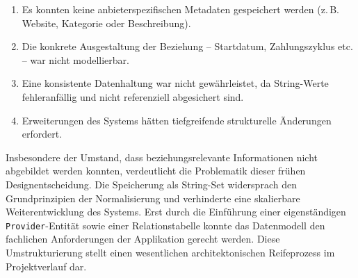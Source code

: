 \begin{enumerate}
    \item Es konnten keine anbieterspezifischen Metadaten gespeichert werden
    (z.\,B. Website, Kategorie oder Beschreibung).
    \item Die konkrete Ausgestaltung der Beziehung -- Startdatum, Zahlungszyklus
    etc. -- war nicht modellierbar.
    \item Eine konsistente Datenhaltung war nicht gewährleistet, da String-Werte
    fehleranfällig und nicht referenziell abgesichert sind.
    \item Erweiterungen des Systems hätten tiefgreifende strukturelle Änderungen
    erfordert.
\end{enumerate}

Insbesondere der Umstand, dass beziehungsrelevante Informationen nicht abgebildet
werden konnten, verdeutlicht die Problematik dieser frühen Designentscheidung.
Die Speicherung als String-Set widersprach den Grundprinzipien der Normalisierung
und verhinderte eine skalierbare Weiterentwicklung des Systems. Erst durch die
Einführung einer eigenständigen \texttt{Provider}-Entität sowie einer
Relationstabelle konnte das Datenmodell den fachlichen Anforderungen der
Applikation gerecht werden. Diese Umstrukturierung stellt einen wesentlichen
architektonischen Reifeprozess im Projektverlauf dar.
